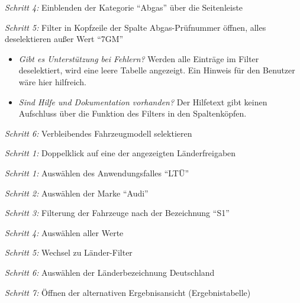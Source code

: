 \textit{Schritt 4:} Einblenden der Kategorie \enquote{Abgas} über die Seitenleiste\par
\textit{Schritt 5:} Filter in Kopfzeile der Spalte Abgas-Prüfnummer öffnen, alles deselektieren außer Wert \enquote{7GM}\par
\begin{itemize}
 \item \textit{Gibt es Unterstützung bei Fehlern?} Werden alle Einträge im Filter deselektiert, wird eine leere Tabelle angezeigt. Ein Hinweis für den Benutzer wäre hier hilfreich.\par
 \item \textit{Sind Hilfe und Dokumentation vorhanden?} Der Hilfetext gibt keinen Aufschluss über die Funktion des Filters in den Spaltenköpfen.\par
\end{itemize}
\textit{Schritt 6:} Verbleibendes Fahrzeugmodell selektieren \par
{}\par
\textit{Schritt 1:} Doppelklick auf eine der angezeigten Länderfreigaben\par
{}\par
\textit{Schritt 1:} Auswählen des Anwendungsfalles \enquote{LTÜ}\par
\textit{Schritt 2:} Auswählen der Marke \enquote{Audi}\par
\textit{Schritt 3:} Filterung der Fahrzeuge nach der Bezeichnung \enquote{S1}\par
\textit{Schritt 4:} Auswählen aller Werte\par
\textit{Schritt 5:} Wechsel zu Länder-Filter\par
\textit{Schritt 6:} Auswählen der Länderbezeichnung Deutschland\par
\textit{Schritt 7:} Öffnen der alternativen Ergebnisansicht (Ergebnistabelle)\par
